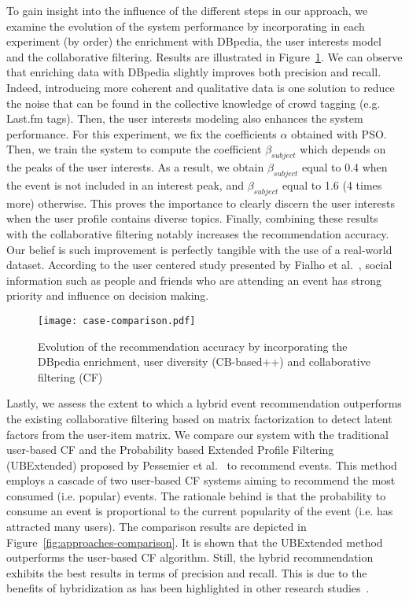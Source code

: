 To gain insight into the influence of the different steps in our approach, we examine the evolution of the system performance by incorporating in each experiment (by order) the enrichment with DBpedia, the user interests model and the collaborative filtering. Results are illustrated in Figure~\ref{fig:case-comparison}. We can observe that enriching data with DBpedia slightly improves both precision and recall. Indeed, introducing more coherent and qualitative data is one solution to reduce the noise that can be found in the collective knowledge of crowd tagging (e.g. Last.fm tags). Then, the user interests modeling also enhances the system performance. For this experiment, we fix the coefficients $\alpha$ obtained with PSO. Then, we train the system to compute the coefficient $\beta_{subject}$ which depends on the peaks of the user interests. As a result, we obtain $\beta_{subject}$ equal to 0.4 when the event is not included in an interest peak, and $\beta_{subject}$ equal to 1.6 (4 times more) otherwise. This proves the importance to clearly discern the user interests when the user profile contains diverse topics. Finally, combining these results with the collaborative filtering notably increases the recommendation accuracy. Our belief is such improvement is perfectly tangible with the use of a real-world dataset. According to the user centered study presented by Fialho et al.~\cite{Fialho:EVENTS10}, social information such as people and friends who are attending an event has strong priority and influence on decision making.

\begin{figure}[H]
  \centering
  \texttt{[image: case-comparison.pdf]}
  \caption{Evolution of the recommendation accuracy by incorporating the DBpedia enrichment, user diversity (CB-based++) and collaborative filtering (CF) }
  \label{fig:case-comparison}
\end{figure}

Lastly, we assess the extent to which a hybrid event recommendation outperforms the existing collaborative filtering based on matrix factorization to detect latent factors from the user-item matrix. We compare our system with the traditional user-based CF and the Probability based Extended Profile Filtering (UBExtended) proposed by Pessemier et al.~\cite{Pessemier:MTA12} to recommend events. This method employs a cascade of two user-based CF systems aiming to recommend the most consumed (i.e. popular) events. The rationale behind is that the probability to consume an event is proportional to the current popularity of the event (i.e. has attracted many users). The comparison results are depicted in Figure~\ref{fig:approaches-comparison}. It is shown that the UBExtended method outperforms the user-based CF algorithm. Still, the hybrid recommendation exhibits the best results in terms of precision and recall. This is due to the benefits of hybridization as has been highlighted in other research studies~\cite{Rojsattarat:2003}.

